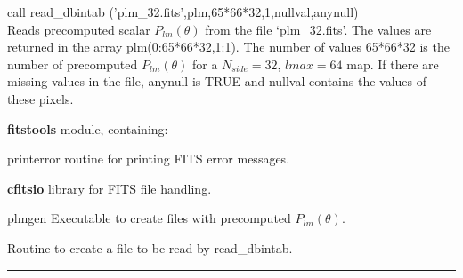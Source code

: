 \begin{example}
{
call read\_dbintab ('plm\_32.fits',plm,65*66*32,1,nullval,anynull)  \\
}
{
Reads precomputed scalar $P_{lm}(\theta)$ from the file `plm\_32.fits'. The values are returned in the array plm(0:65*66*32,1:1). The number of values 65*66*32 is the number of precomputed $P_{lm}(\theta)$ for a $N_{side}=32$, $lmax=64$ map. If there are missing values in the file, anynull is TRUE and nullval contains the values of these pixels.
}
\end{example}

\begin{modules}
  \begin{sulist}{} %
  \item[\textbf{fitstools}] module, containing:
  \item[printerror] routine for printing FITS error messages.
  \item[\textbf{cfitsio}] library for FITS file handling.		
  \end{sulist}
\end{modules}

\begin{related}
  \begin{sulist}{} %
  \item[plmgen] Executable to create files with precomputed $P_{lm}(\theta)$.
  \item[\htmlref{write\_plm}{sub:write_plm}] Routine to create a file to be read by read\_dbintab.
  \end{sulist}
\end{related}

\rule{\hsize}{2mm}

\newpage
